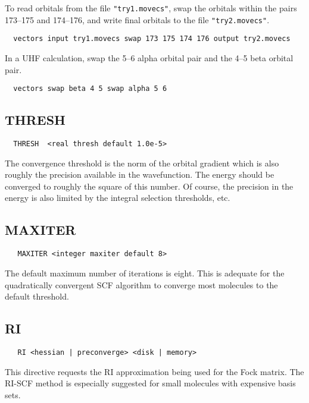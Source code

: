 To read orbitals from the file \verb+"try1.movecs"+, swap the orbitals
within the pairs 173--175 and 174--176, and write final orbitals to
the file \verb+"try2.movecs"+.
\begin{verbatim}
  vectors input try1.movecs swap 173 175 174 176 output try2.movecs
\end{verbatim}

In a UHF calculation, swap the 5--6 alpha orbital pair and the 4--5
beta orbital pair.
\begin{verbatim}
  vectors swap beta 4 5 swap alpha 5 6
\end{verbatim}


\subsection{THRESH}

\begin{verbatim}
  THRESH  <real thresh default 1.0e-5>
\end{verbatim}

The convergence threshold is the norm of the orbital gradient which is
also roughly the precision available in the wavefunction.  The energy
should be converged to roughly the square of this number.  Of course,
the precision in the energy is also limited by the integral selection
thresholds, etc. 

\subsection{MAXITER}

\begin{verbatim}
   MAXITER <integer maxiter default 8>
\end{verbatim}

The default maximum number of iterations is eight.  This is adequate for
the quadratically convergent SCF algorithm to converge most molecules
to the default threshold.

\subsection{RI}

\begin{verbatim}
   RI <hessian | preconverge> <disk | memory>
\end{verbatim}

This directive requests the RI approximation being used for the Fock matrix.
The RI-SCF method is especially suggested for small molecules with
expensive basis sets.

